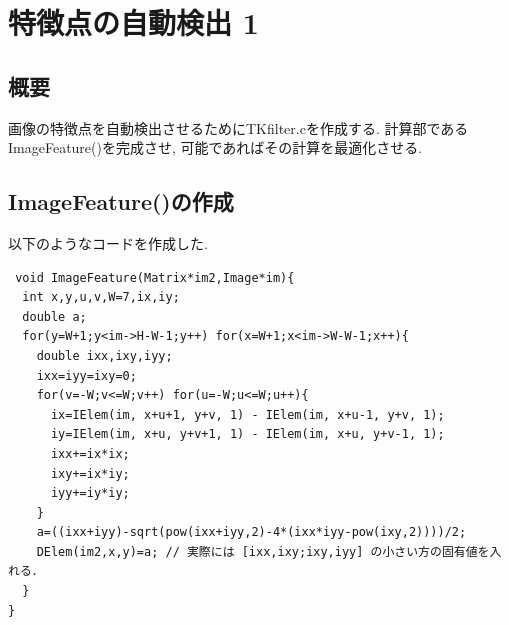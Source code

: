 \documentclass[a4j]{jarticle}
\begin{document}
\section{特徴点の自動検出 1}
\subsection{概要}
画像の特徴点を自動検出させるためにTKfilter.cを作成する.
計算部であるImageFeature()を完成させ, 可能であればその計算を最適化させる. 

\subsection{ImageFeature()の作成}
以下のようなコードを作成した.

\begin{verbatim}
 void ImageFeature(Matrix*im2,Image*im){
  int x,y,u,v,W=7,ix,iy;
  double a;
  for(y=W+1;y<im->H-W-1;y++) for(x=W+1;x<im->W-W-1;x++){
    double ixx,ixy,iyy;
    ixx=iyy=ixy=0;
    for(v=-W;v<=W;v++) for(u=-W;u<=W;u++){
      ix=IElem(im, x+u+1, y+v, 1) - IElem(im, x+u-1, y+v, 1);
      iy=IElem(im, x+u, y+v+1, 1) - IElem(im, x+u, y+v-1, 1);
      ixx+=ix*ix;
      ixy+=ix*iy;
      iyy+=iy*iy;
    }
    a=((ixx+iyy)-sqrt(pow(ixx+iyy,2)-4*(ixx*iyy-pow(ixy,2))))/2;
    DElem(im2,x,y)=a; // 実際には [ixx,ixy;ixy,iyy] の小さい方の固有値を入れる．
  }
}
\end{verbatim}
\end{document}
